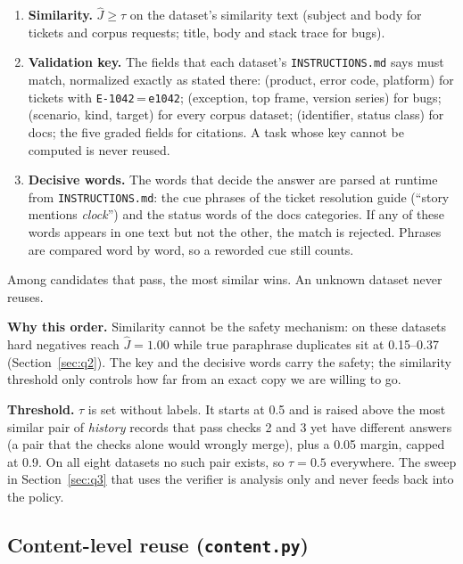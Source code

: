 \documentclass[11pt]{article}
\begin{document}
\begin{enumerate}
  \item \textbf{Similarity.} $\hat J \ge \tau$ on the dataset's similarity text
        (subject and body for tickets and corpus requests; title, body and stack trace for
        bugs).
  \item \textbf{Validation key.} The fields that each dataset's \texttt{INSTRUCTIONS.md} says
        must match, normalized exactly as stated there: (product, error code, platform) for
        tickets with \texttt{E-1042}\,=\,\texttt{e1042}; (exception, top frame, version
        series) for bugs; (scenario, kind, target) for every corpus dataset; (identifier,
        status class) for docs; the five graded fields for citations. A task whose key cannot
        be computed is never reused.
  \item \textbf{Decisive words.} The words that decide the answer are parsed at runtime
        from \texttt{INSTRUCTIONS.md}: the cue phrases of the ticket resolution guide
        (``story mentions \emph{clock}'') and the status words of the docs categories. If any
        of these words appears in one text but not the other, the match is rejected.
        Phrases are compared word by word, so a reworded cue still counts.
\end{enumerate}

Among candidates that pass, the most similar wins. An unknown dataset never reuses.

\textbf{Why this order.} Similarity cannot be the safety mechanism: on these datasets hard
negatives reach $\hat J = 1.00$ while true paraphrase duplicates sit at 0.15--0.37
(Section~\ref{sec:q2}). The key and the decisive words carry the safety; the similarity
threshold only controls how far from an exact copy we are willing to go.

\textbf{Threshold.} $\tau$ is set without labels. It starts at 0.5 and is raised above the
most similar pair of \emph{history} records that pass checks 2 and 3 yet have different
answers (a pair that the checks alone would wrongly merge), plus a 0.05 margin, capped at
0.9. On all eight datasets no such pair exists, so $\tau = 0.5$ everywhere. The sweep in
Section~\ref{sec:q3} that uses the verifier is analysis only and never feeds back into the
policy.

\subsection{Content-level reuse (\texttt{content.py})}
\end{document}
